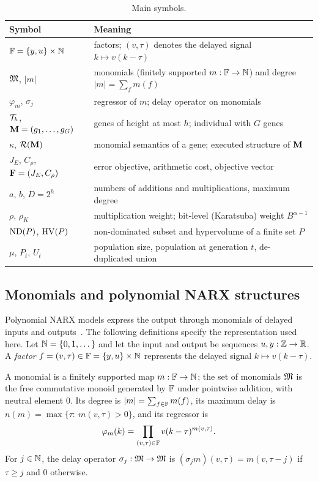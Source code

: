 \begin{table}[t]
\centering
\caption{Main symbols.}
\label{tab:symbols}
\small
\begin{tabular}{ll}
\toprule
Symbol & Meaning \\
\midrule
$\mathbb{F}=\{y,u\}\times\mathbb{N}$ & factors; $(v,\tau)$ denotes the delayed signal $k\mapsto v(k-\tau)$ \\
$\mathfrak{M}$, $|m|$ & monomials (finitely supported $m:\mathbb{F}\to\mathbb{N}$) and degree $|m|=\sum_f m(f)$ \\
$\varphi_m$, $\sigma_j$ & regressor of $m$; delay operator on monomials \\
$\mathcal{T}_h$, $\mathbf{M}=(g_1,\dots,g_G)$ & genes of height at most $h$; individual with $G$ genes \\
$\kappa$, $\mathcal{R}(\mathbf{M})$ & monomial semantics of a gene; executed structure of $\mathbf{M}$ \\
$J_E$, $C_\rho$, $\mathbf{F}=(J_E,C_\rho)$ & error objective, arithmetic cost, objective vector \\
$a$, $b$, $D=2^{h}$ & numbers of additions and multiplications, maximum degree \\
$\rho$, $\rho_K$ & multiplication weight; bit-level (Karatsuba) weight $B^{\alpha-1}$ \\
$\operatorname{ND}(P)$, $\operatorname{HV}(P)$ & non-dominated subset and hypervolume of a finite set $P$ \\
$\mu$, $P_t$, $U_t$ & population size, population at generation $t$, de-duplicated union \\
\bottomrule
\end{tabular}
\end{table}

\subsection{Monomials and polynomial NARX structures}
Polynomial NARX models express the output through monomials of delayed inputs and outputs~\cite{Bil2013}. The following definitions specify the representation used here.
Let $\mathbb{N}=\{0,1,\dots\}$ and let the input and output be sequences $u,y:\mathbb Z\to\mathbb{R}$. A \emph{factor}
$f=(v,\tau)\in\mathbb{F}=\{y,u\}\times\mathbb{N}$ represents the delayed signal $k\mapsto v(k-\tau)$.

\begin{definition}[Monomials]\label{def:monomial}
A monomial is a finitely supported map $m:\mathbb{F}\to\mathbb{N}$; the set of monomials $\mathfrak{M}$ is the free commutative monoid
generated by $\mathbb{F}$ under pointwise addition, with neutral element $0$. Its degree is $|m|=\sum_{f\in\mathbb{F}}m(f)$, its
maximum delay is $n(m)=\max\{\tau:\ m(v,\tau)>0\}$, and its regressor is
\begin{equation}
\varphi_m(k)=\prod_{(v,\tau)\in\mathbb{F}}v(k-\tau)^{m(v,\tau)} .
\end{equation}
For $j\in\mathbb{N}$, the delay operator $\sigma_j:\mathfrak{M}\to\mathfrak{M}$ is $(\sigma_j m)(v,\tau)=m(v,\tau-j)$ if $\tau\ge j$ and
$0$ otherwise.
\end{definition}

